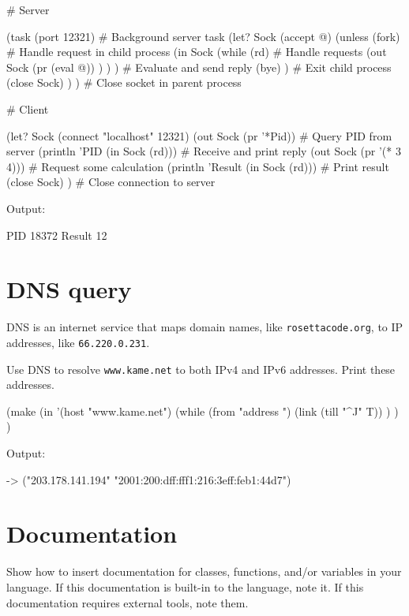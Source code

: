 \begin{wideverbatim}

# Server

(task (port 12321)                     # Background server task
   (let? Sock (accept @)
      (unless (fork)                   # Handle request in child process
         (in Sock
            (while (rd)                # Handle requests
               (out Sock
                  (pr (eval @)) ) ) )  # Evaluate and send reply
         (bye) )                       # Exit child process
      (close Sock) ) )                 # Close socket in parent process

# Client

(let? Sock (connect "localhost" 12321)
   (out Sock (pr '*Pid))               # Query PID from server
   (println 'PID (in Sock (rd)))       # Receive and print reply
   (out Sock (pr '(* 3 4)))            # Request some calculation
   (println 'Result (in Sock (rd)))    # Print result
   (close Sock) )                      # Close connection to server

Output:

PID 18372
Result 12

\end{wideverbatim}

\pagebreak{}
\section*{DNS query}

DNS is an internet service that maps domain names, like
\texttt{rosettacode.org}, to IP addresses, like \texttt{66.220.0.231}.

Use DNS to resolve \texttt{www.kame.net} to both IPv4 and IPv6
addresses. Print these addresses.


\begin{wideverbatim}

(make
   (in '(host "www.kame.net")
      (while (from "address ")
         (link (till "^J" T)) ) ) )

Output:

-> ("203.178.141.194" "2001:200:dff:fff1:216:3eff:feb1:44d7")

\end{wideverbatim}


\pagebreak{}
\section*{Documentation}

Show how to insert documentation for classes, functions, and/or
variables in your language. If this documentation is built-in to the
language, note it. If this documentation requires external tools, note
them.

